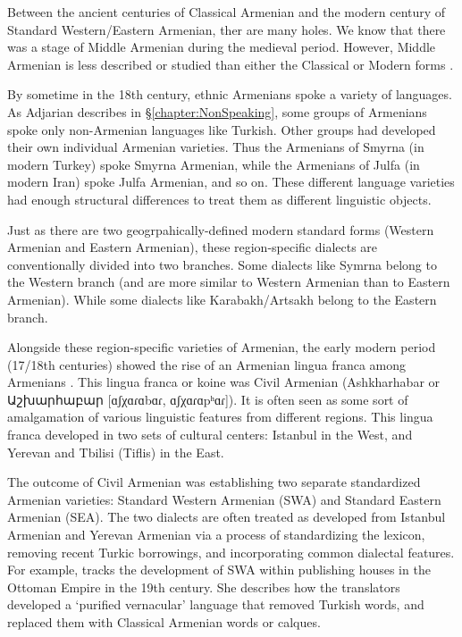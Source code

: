 Between the ancient centuries of Classical Armenian and the modern century of Standard Western/Eastern Armenian, ther are many holes. We know that there was a stage of Middle Armenian during the medieval period. However, Middle Armenian is less described or studied than either the Classical or Modern forms \citep{Karst-1901-MiddleArmenain}. 

By sometime in the 18th century, ethnic Armenians spoke a variety of languages. As Adjarian describes in \S\ref{chapter:NonSpeaking}, some groups of Armenians spoke only non-Armenian languages like Turkish. Other groups had developed their own individual Armenian varieties. Thus the Armenians of Smyrna (in modern Turkey) spoke Smyrna Armenian, while the Armenians of Julfa (in modern Iran) spoke Julfa Armenian, and so on. These different language varieties had enough structural differences to treat them as different linguistic objects. 

Just as there are two geogrpahically-defined modern standard forms (Western Armenian and Eastern Armenian), these region-specific dialects are conventionally divided into two branches. Some dialects like Symrna belong to the Western branch (and are more similar to Western Armenian than to Eastern Armenian). While some dialects like Karabakh/Artsakh belong to the Eastern branch. 

Alongside these region-specific varieties of Armenian, the early modern period (17/18th centuries) showed the rise of an Armenian lingua franca among Armenians \citep{Parnassian-1985-FormationAshkharabar,Donabedian-2018-WestArmTypoSocio}. This lingua franca or koine was Civil Armenian (Ashkharhabar or Աշխարհաբար [ɑʃχɑɾɑbɑɾ, ɑʃχɑɾɑpʰɑɾ]). It is often seen as some sort of amalgamation of various linguistic features from different regions. This lingua franca developed in two sets of cultural centers: Istanbul in the West, and Yerevan and Tbilisi (Tiflis) in the East. 

The outcome of Civil Armenian was establishing two separate standardized Armenian varieties: Standard Western Armenian (SWA) and Standard Eastern Armenian (SEA). The two dialects are often treated as developed from Istanbul Armenian and Yerevan Armenian via a process of standardizing the lexicon, removing recent Turkic borrowings, and incorporating common dialectal features. For example, \citet{Manoukian-2022-LiteraryTranslationExpansionOttomanArmenian} tracks the development of SWA within publishing houses in the Ottoman Empire in the 19th century. She describes how the translators developed a `purified vernacular' language that removed Turkish words, and replaced them with Classical Armenian words or calques. 

